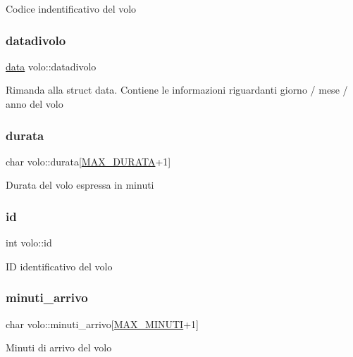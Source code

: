 Codice indentificativo del volo \mbox{\label{structvolo_ad12757b6945cad6bb633b29d72dd58ef}} 
\subsubsection{\texorpdfstring{datadivolo}{datadivolo}}
{\footnotesize\ttfamily \hyperlink{structdata}{data} volo\+::datadivolo}

Rimanda alla struct data. Contiene le informazioni riguardanti giorno / mese / anno del volo \mbox{\label{structvolo_a0d869a43e985f858edac3dfc796484b9}} 
\subsubsection{\texorpdfstring{durata}{durata}}
{\footnotesize\ttfamily char volo\+::durata\mbox{[}\hyperlink{define_8h_afdc1d62558736f5b72c015ed10b9e216}{M\+A\+X\+\_\+\+D\+U\+R\+A\+TA}+1\mbox{]}}

Durata del volo espressa in minuti \mbox{\label{structvolo_a57c5aa808be475f1d9d5ab0b9790197b}} 
\subsubsection{\texorpdfstring{id}{id}}
{\footnotesize\ttfamily int volo\+::id}

ID identificativo del volo \mbox{\label{structvolo_ab85573e3b6903e72e14034bb17b05420}} 
\subsubsection{\texorpdfstring{minuti\+\_\+arrivo}{minuti\_arrivo}}
{\footnotesize\ttfamily char volo\+::minuti\+\_\+arrivo\mbox{[}\hyperlink{define_8h_ac5b85a4e0fdb0ecb53800fca4922a22a}{M\+A\+X\+\_\+\+M\+I\+N\+U\+TI}+1\mbox{]}}

Minuti di arrivo del volo \mbox{\label{structvolo_ad42a90fabccc19bf3bba2ad8f392cee3}} 
